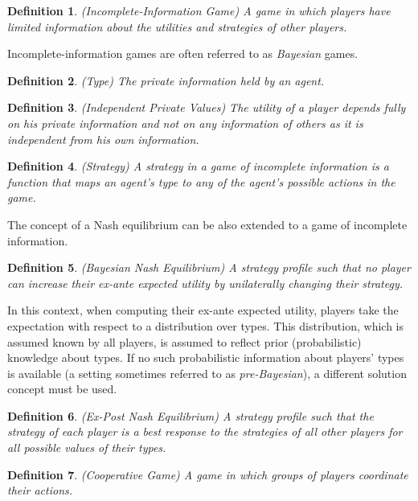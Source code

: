 \documentclass{article}
\newtheorem{definition}{Definition}
\begin{document}
\begin{definition}
(Incomplete-Information Game) A game in which players have limited information about the utilities and strategies of other players.
\end{definition}

Incomplete-information games are often referred to as \textit{Bayesian} games.

\begin{definition}
(Type) The private information held by an agent.
\end{definition}

\begin{definition}
(Independent Private Values) The utility of a player depends fully on his private information and not on any information of others as it is independent from his own information.
\end{definition}

\begin{definition}
(Strategy) A strategy in a game of incomplete information is a function that maps an agent's type to
any of the agent's possible actions in the game.
\end{definition}

The concept of a Nash equilibrium can be also extended to a game of incomplete information.

\begin{definition}
(Bayesian Nash Equilibrium) A strategy profile such that no player can increase their ex-ante expected utility by unilaterally changing their strategy.
\end{definition}

In this context, when computing their ex-ante expected utility, players take the expectation with respect to a distribution over types. This distribution, which is assumed known by all players, is assumed to reflect prior (probabilistic) knowledge about types. If no such probabilistic information about players' types is available (a setting sometimes referred to as \textit{pre-Bayesian}), a different solution concept must be used. 

\begin{definition}
(Ex-Post Nash Equilibrium) A strategy profile such that the strategy of each player is a best response to the strategies of all other players for all possible values of their types.
\end{definition}

\begin{definition}
(Cooperative Game) A game in which groups of players coordinate their actions.
\end{definition}
\end{document}
